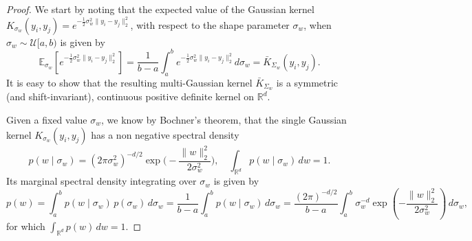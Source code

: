 \documentclass{article}
\begin{document}
\begin{proof}
We start by noting that the expected value of the Gaussian kernel $K_{\sigma_w}(y_i, y_j)=e^{-\frac{1}{2}\sigma_w^2 \|y_i - y_j\|_2^2}$, with respect to the shape parameter $\sigma_w$, when $\sigma_w\sim\mathcal{U}[a,b)$ is given by
\begin{equation}
\mathbb{E}_{\sigma_w} \left[e^{-\frac{1}{2}\sigma_w^2 \|y_i - y_j\|_2^2}\right]
= \frac{1}{b-a} \int_a^b e^{-\frac{1}{2}\sigma_w^2 \|y_i - y_j\|_2^2} d\sigma_w=\bar{K}_{\Sigma_w}(y_i,y_j).
\label{eq:mixedgaussians}
\end{equation}
It is easy to show that the resulting multi-Gaussian kernel $\bar{K}_{\Sigma_w}$ is a symmetric (and shift-invariant), continuous positive definite kernel on $\mathbb{R}^d$.


Given a fixed value $\sigma_w$, we know by Bochner's theorem, that the single Gaussian kernel $K_{\sigma_w}(y_i, y_j)$ has a non negative spectral density
\begin{equation}
p(w\mid\sigma_w)
=(2\pi\sigma_w^2)^{-d/2}\exp\Big(-\frac{\|w\|_2^2}{2\sigma_w^2}\Big),
\quad \int_{\mathbb{R}^d} p(w\mid\sigma_w)\,dw = 1.
\end{equation}
Its marginal spectral density integrating over $\sigma_w$ is given by
\begin{equation}
p(w) = \int_a^b p(w \mid \sigma_w) \, p(\sigma_w) \, d\sigma_w=\frac{1}{b-a}\int_a^b p(w\mid \sigma_w)\,d\sigma_w
=\frac{(2\pi)^{-d/2}}{b-a}
\int_a^b \sigma_w^{-d}\exp \left(-\frac{\|w\|_2^2}{2\sigma_w^2}\right)\,d\sigma_w,
\label{eq:marginal}
\end{equation}
for which $\int_{\mathbb{R}^d} p(w)\,dw = 1.$


\end{proof}
\end{document}

